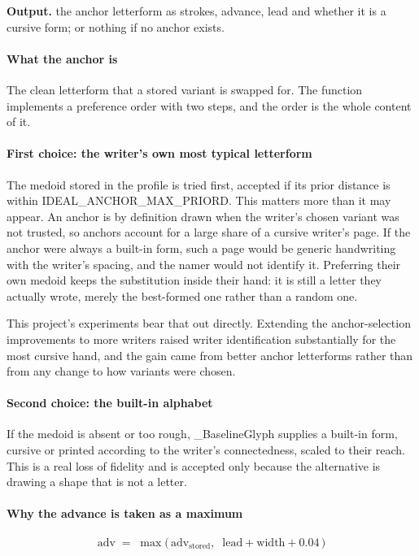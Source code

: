 \noindent\textbf{Output.} the anchor letterform as strokes, advance, lead and whether it is a cursive form; or nothing if no anchor exists.


\paragraph{What the anchor is}
The clean letterform that a stored variant is swapped for. The function implements a preference order with two steps, and the order is the whole content of it.


\paragraph{First choice: the writer's own most typical letterform}
The medoid stored in the profile is tried first, accepted if its prior distance is within IDEAL\_ANCHOR\_MAX\_PRIORD. This matters more than it may appear. An anchor is by definition drawn when the writer's chosen variant was not trusted, so anchors account for a large share of a cursive writer's page. If the anchor were always a built-in form, such a page would be generic handwriting with the writer's spacing, and the namer would not identify it. Preferring their own medoid keeps the substitution inside their hand: it is still a letter they actually wrote, merely the best-formed one rather than a random one.

This project's experiments bear that out directly. Extending the anchor-selection improvements to more writers raised writer identification substantially for the most cursive hand, and the gain came from better anchor letterforms rather than from any change to how variants were chosen.


\paragraph{Second choice: the built-in alphabet}
If the medoid is absent or too rough, \_BaselineGlyph supplies a built-in form, cursive or printed according to the writer's connectedness, scaled to their reach. This is a real loss of fidelity and is accepted only because the alternative is drawing a shape that is not a letter.


\paragraph{Why the advance is taken as a maximum}

\begin{equation}
\mathrm{adv} \;=\; \max\big(\,\mathrm{adv}_{\mathrm{stored}},\;\; \mathrm{lead} + \mathrm{width} + 0.04 \,\big)
\end{equation}

